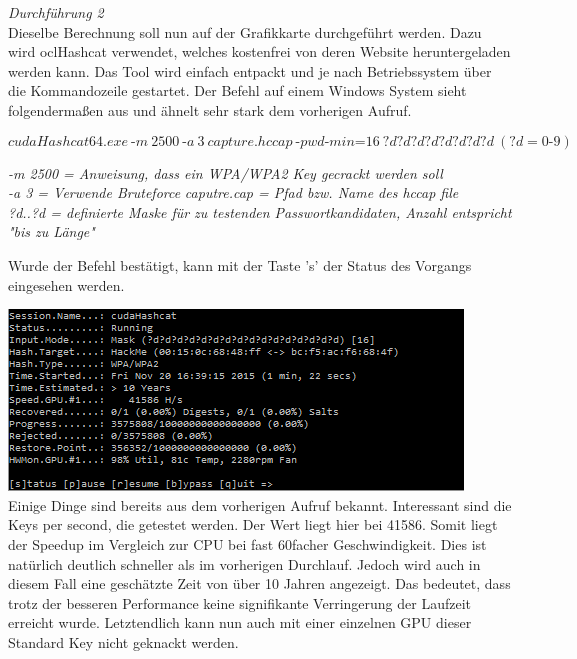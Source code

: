 \textit{Durchführung 2}\\

Dieselbe Berechnung soll nun auf der Grafikkarte durchgeführt werden. Dazu wird oclHashcat verwendet, welches kostenfrei von deren Website heruntergeladen werden kann. Das Tool wird einfach entpackt und je nach Betriebssystem über die Kommandozeile gestartet. Der Befehl auf einem Windows System sieht folgendermaßen aus und ähnelt sehr stark dem vorherigen Aufruf.

$$cudaHashcat64.exe~\text{-}m~2500~\text{-}a~3~capture.hccap~\text{-}pwd\text{-}min\text{=}16~?d?d?d?d?d?d?d?d~(?d = 0\text{-}9)$$

\textit{-m 2500 = Anweisung, dass ein WPA/WPA2 Key gecrackt werden soll}\\
\textit{-a 3 = Verwende Bruteforce}
\textit{caputre.cap = Pfad bzw. Name des hccap file}\\
\textit{?d..?d = definierte Maske für zu testenden Passwortkandidaten, Anzahl entspricht "bis zu Länge"\\}

Wurde der Befehl bestätigt, kann mit der Taste 's' der Status des Vorgangs eingesehen werden.

\includegraphics[width=\textwidth]{bilder/wlan/cudaHashcatNUMSeriesCrack.png}\\

 Einige Dinge sind bereits aus dem vorherigen Aufruf bekannt. Interessant sind die Keys per second, die getestet werden. Der Wert liegt hier bei 41586. Somit liegt der Speedup im Vergleich zur CPU bei fast 60facher
Geschwindigkeit. Dies ist natürlich deutlich schneller als im vorherigen Durchlauf. Jedoch wird auch in diesem Fall eine geschätzte Zeit von über 10 Jahren angezeigt. Das bedeutet, dass trotz der besseren Performance keine signifikante Verringerung der Laufzeit erreicht wurde. 
Letztendlich kann nun auch mit einer einzelnen GPU dieser Standard Key nicht geknackt werden.\\


